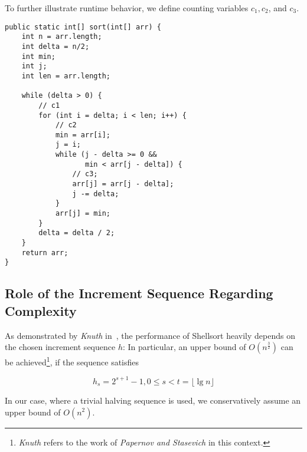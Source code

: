 To further illustrate runtime behavior, we define counting variables $c_1, c_2$, and $c_3$.

\vspace{4mm}
\begin{lstlisting}[style=javastyle, caption={Shellsort implementation using halving sequences. }, label=lst:shell]
public static int[] sort(int[] arr) {
    int n = arr.length;
    int delta = n/2;
    int min;
    int j;
    int len = arr.length;

    while (delta > 0) {
        // c1
        for (int i = delta; i < len; i++) {
            // c2
            min = arr[i];
            j = i;
            while (j - delta >= 0 &&
                   min < arr[j - delta]) {
                // c3;
                arr[j] = arr[j - delta];
                j -= delta;
            }
            arr[j] = min;
        }
        delta = delta / 2;
    }
    return arr;
}
\end{lstlisting}
\vspace{4mm}


\subsection{Role of the Increment Sequence Regarding Complexity}

As demonstrated by \textit{Knuth} in~\cite[91]{Knu97b}, the performance of Shellsort heavily  depends on the chosen increment sequence $h$: In particular, an upper bound of $O(n^{\frac{3}{2}})$ can be achieved\footnote{
\textit{Knuth} refers to the work of \textit{Papernov and Stasevich} \cite{PS65} in this context.
}, if the sequence satisfies

\[
    h_s = 2^{s+1} - 1, 0 \leq s < t = \lfloor{\lg n} \rfloor
\]

\noindent
In our case, where a trivial halving sequence is used, we conservatively assume an upper bound of $O(n^2)$.

